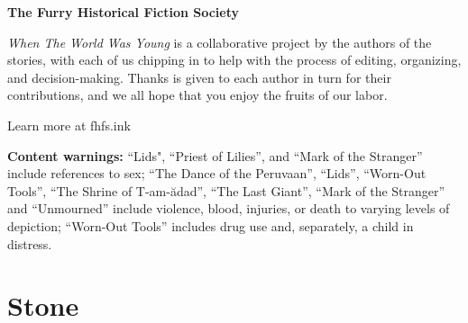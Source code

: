 \documentclass[11pt]{memoir}
\begin{document}
  \newpage

  

  \newpage
  \null
  \cleardoublepage
  \tableofcontents*
  \newpage
  \null
  \cleardoublepage

  \null
  \vfill

  \begin{center}
  \FHFS\huge \textbf{The Furry Historical Fiction Society}
  \end{center}
  
  \noindent\emph{When The World Was Young} is a collaborative project by the authors of the stories, with each of us chipping in to help with the process of editing, organizing, and decision-making. Thanks is given to each author in turn for their contributions, and we all hope that you enjoy the fruits of our labor.

  \vspace{1ex}

  \begin{center}
  \noindent Learn more at {\FHFS fhfs.ink}
  \end{center}

  \vfill

  \noindent\textbf{Content warnings:} ``Lids", ``Priest of Lilies'', and ``Mark of the Stranger'' include references to sex; ``The Dance of the Peruvaan'', ``Lids'', ``Worn-Out Tools'', ``The Shrine of T-am-ădad'', ``The Last Giant'', ``Mark of the Stranger'' and ``Unmourned'' include violence, blood, injuries, or death to varying levels of depiction; ``Worn-Out Tools'' includes drug use and, separately, a child in distress.

  \mainmatter

  \pagestyle{ourbook}

  \part*{Stone}
  \thispagestyle{empty}
	
  
  
  \storydiv
	
  
  
  \storydiv
  
  
  
  \storydiv
	
  
  
  \storydiv
  
\end{document}
